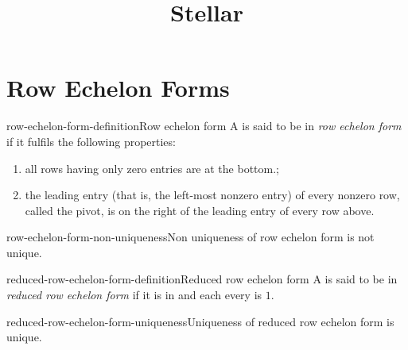 \documentclass[preview]{standalone}
\begin{document}
\title{Stellar}
\genpage

\section{Row Echelon Forms}

\begin{snippetdefinition}{row-echelon-form-definition}{Row echelon form}
    A  is said to be in \textit{row echelon form}
    if it fulfils the following properties:
    \begin{enumerate}
        \item all rows having only zero entries are at the bottom.;
        \item the leading entry (that is, the left-most nonzero entry) of every nonzero row,
        called the pivot, is on the right of the leading entry of every row above.
    \end{enumerate}
\end{snippetdefinition}

\begin{snippetproposition}{row-echelon-form-non-uniqueness}{Non uniqueness of row echelon form}
     is not unique.
\end{snippetproposition}

\begin{snippetdefinition}{reduced-row-echelon-form-definition}{Reduced row echelon form}
    A  is said to be in \textit{reduced row echelon form}
    if it is in  and
    each every \matrixpivot is \(1\).
\end{snippetdefinition}

\begin{snippetproposition}{reduced-row-echelon-form-uniqueness}{Uniqueness of reduced row echelon form}
     is unique.
\end{snippetproposition}
\end{document}
